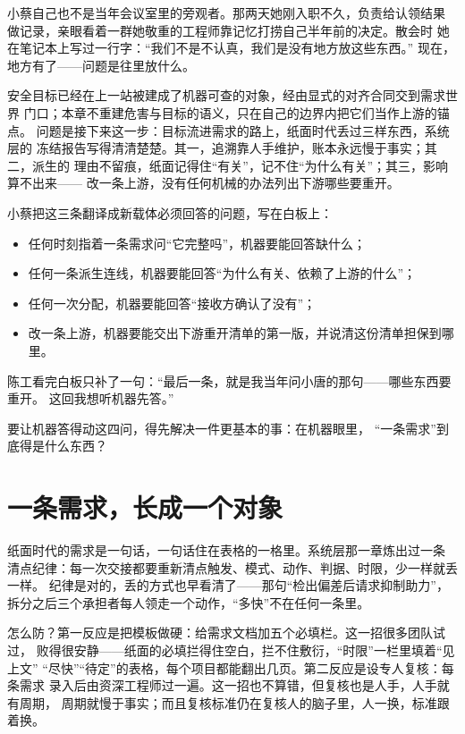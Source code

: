 小蔡自己也不是当年会议室里的旁观者。那两天她刚入职不久，负责给认领结果
做记录，亲眼看着一群她敬重的工程师靠记忆打捞自己半年前的决定。散会时
她在笔记本上写过一行字：“我们不是不认真，我们是没有地方放这些东西。”
现在，地方有了——问题是往里放什么。

安全目标已经在上一站被建成了机器可查的对象，经由显式的对齐合同交到需求世界
门口；本章不重建危害与目标的语义，只在自己的边界内把它们当作上游的锚点。
问题是接下来这一步：目标流进需求的路上，纸面时代丢过三样东西，系统层的
冻结报告写得清清楚楚。其一，追溯靠人手维护，账本永远慢于事实；其二，派生的
理由不留痕，纸面记得住“有关”，记不住“为什么有关”；其三，影响算不出来——
改一条上游，没有任何机械的办法列出下游哪些要重开。

小蔡把这三条翻译成新载体必须回答的问题，写在白板上：

\begin{itemize}
\item 任何时刻指着一条需求问“它完整吗”，机器要能回答缺什么；
\item 任何一条派生连线，机器要能回答“为什么有关、依赖了上游的什么”；
\item 任何一次分配，机器要能回答“接收方确认了没有”；
\item 改一条上游，机器要能交出下游重开清单的第一版，并说清这份清单担保到哪里。
\end{itemize}

陈工看完白板只补了一句：“最后一条，就是我当年问小唐的那句——哪些东西要重开。
这回我想听机器先答。”

要让机器答得动这四问，得先解决一件更基本的事：在机器眼里，
“一条需求”到底得是什么东西？

\section{一条需求，长成一个对象}

纸面时代的需求是一句话，一句话住在表格的一格里。系统层那一章炼出过一条
清点纪律：每一次交接都要重新清点触发、模式、动作、判据、时限，少一样就丢一样。
纪律是对的，丢的方式也早看清了——那句“检出偏差后请求抑制助力”，
拆分之后三个承担者每人领走一个动作，“多快”不在任何一条里。

怎么防？第一反应是把模板做硬：给需求文档加五个必填栏。这一招很多团队试过，
败得很安静——纸面的必填拦得住空白，拦不住敷衍，“时限”一栏里填着“见上文”
“尽快”“待定”的表格，每个项目都能翻出几页。第二反应是设专人复核：每条需求
录入后由资深工程师过一遍。这一招也不算错，但复核也是人手，人手就有周期，
周期就慢于事实；而且复核标准仍在复核人的脑子里，人一换，标准跟着换。

